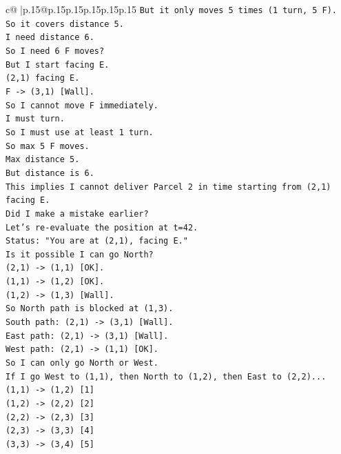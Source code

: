 \documentclass{article}
\begin{document}
{\begin{supertabular}{c@{$\;$}|p{.15\linewidth}@{}p{.15\linewidth}p{.15\linewidth}p{.15\linewidth}p{.15\linewidth}p{.15\linewidth}}
{{{\texttt{But it only moves 5 times (1 turn, 5 F).} \\
\texttt{So it covers distance 5.} \\
\texttt{I need distance 6.} \\
\texttt{So I need 6 F moves?} \\
\texttt{But I start facing E.} \\
\texttt{(2,1) facing E.} \\
\texttt{F {-}> (3,1) {[}Wall{]}.} \\
\texttt{So I cannot move F immediately.} \\
\texttt{I must turn.} \\
\texttt{So I must use at least 1 turn.} \\
\texttt{So max 5 F moves.} \\
\texttt{Max distance 5.} \\
\texttt{But distance is 6.} \\
\texttt{This implies I cannot deliver Parcel 2 in time starting from (2,1) facing E.} \\
\texttt{Did I make a mistake earlier?} \\
\texttt{Let's re{-}evaluate the position at t=42.} \\
\texttt{Status: "You are at (2,1), facing E."} \\
\texttt{Is it possible I can go North?} \\
\texttt{(2,1) {-}> (1,1) {[}OK{]}.} \\
\texttt{(1,1) {-}> (1,2) {[}OK{]}.} \\
\texttt{(1,2) {-}> (1,3) {[}Wall{]}.} \\
\texttt{So North path is blocked at (1,3).} \\
\texttt{South path: (2,1) {-}> (3,1) {[}Wall{]}.} \\
\texttt{East path: (2,1) {-}> (3,1) {[}Wall{]}.} \\
\texttt{West path: (2,1) {-}> (1,1) {[}OK{]}.} \\
\texttt{So I can only go North or West.} \\
\texttt{If I go West to (1,1), then North to (1,2), then East to (2,2)...} \\
\texttt{(1,1) {-}> (1,2) {[}1{]}} \\
\texttt{(1,2) {-}> (2,2) {[}2{]}} \\
\texttt{(2,2) {-}> (2,3) {[}3{]}} \\
\texttt{(2,3) {-}> (3,3) {[}4{]}} \\
\texttt{(3,3) {-}> (3,4) {[}5{]}} \\
}}}
\end{supertabular}}
\end{document}

